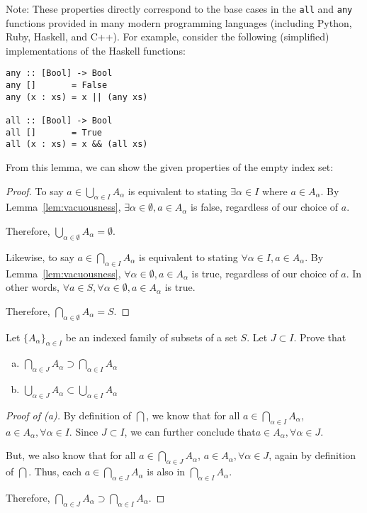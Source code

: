 Note: These properties directly correspond to the base cases in the \texttt{all} and \texttt{any} functions provided in many modern programming languages
(including Python, Ruby, Haskell, and C++). For example, consider the following (simplified) implementations of the Haskell functions:

\begin{verbatim}
any :: [Bool] -> Bool
any []       = False
any (x : xs) = x || (any xs)

all :: [Bool] -> Bool
all []       = True
all (x : xs) = x && (all xs)
\end{verbatim}

From this lemma, we can show the given properties of the empty index set:

\begin{proof}
	To say $a \in \bigcup_{\alpha \in I} A_\alpha$ is equivalent to stating $\exists \alpha \in I$ where $a \in A_\alpha$.
	By Lemma~\ref{lem:vacuousness}, $\exists \alpha \in \emptyset, a \in A_\alpha$ is false, regardless of our choice of $a$.

	Therefore, $\bigcup_{\alpha \in \emptyset} A_\alpha = \emptyset$.

	Likewise, to say $a \in \bigcap_{\alpha \in I} A_\alpha$ is equivalent to stating $\forall \alpha \in I, a \in A_\alpha$.
	By Lemma~\ref{lem:vacuousness}, $\forall \alpha \in \emptyset, a \in A_\alpha$ is true, regardless of our choice of $a$.
	In other words, $\forall a \in S, \forall \alpha \in \emptyset, a \in A_\alpha$ is true.

	Therefore, $\bigcap_{\alpha \in \emptyset} A_\alpha = S$.
\end{proof}

\begin{problem}[3]
	Let $\{A_\alpha\}_{\alpha \in I}$ be an indexed family of subsets of a set $S$. Let $J \subset I$. Prove that
	\begin{enumerate}[(a)]
		\item $\bigcap_{\alpha \in J} A_\alpha \supset \bigcap_{\alpha \in I} A_\alpha$
		\item $\bigcup_{\alpha \in J} A_\alpha \subset \bigcup_{\alpha \in I} A_\alpha$
	\end{enumerate}
\end{problem}


\begin{proof}[Proof of (a)]
	By definition of $\bigcap$, we know that for all $a \in \bigcap_{\alpha \in I} A_\alpha$, $a \in A_\alpha, \forall \alpha \in I$.
	Since $J \subset I$, we can further conclude that$a \in A_\alpha, \forall \alpha \in J$.

	But, we also know that for all $a \in \bigcap_{\alpha \in J} A_\alpha$, $a \in A_\alpha, \forall \alpha \in J$, again by definition of $\bigcap$.
	Thus, each $a \in \bigcap_{\alpha \in J} A_\alpha$ is also in $\bigcap_{\alpha \in I} A_\alpha$.

	Therefore, $\bigcap_{\alpha \in J} A_\alpha \supset \bigcap_{\alpha \in I} A_\alpha$.
\end{proof}

